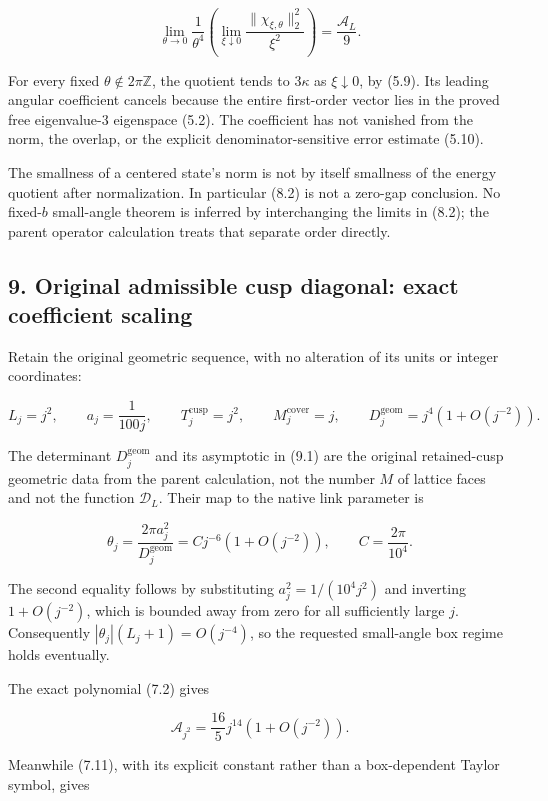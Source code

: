 \documentclass[
  11pt,
]{article}
\begin{document}
\[
\lim_{\theta\to0}\frac1{\theta^4}
\left(\lim_{\xi\downarrow0}\frac{\|\chi_{\xi,\theta}\|_2^2}{\xi^2}\right)
=\frac{\mathcal A_L}{9}.
\tag{8.2}
\]

For every fixed \(\theta\notin2\pi\mathbb Z\), the quotient tends to
\(3\kappa\) as \(\xi\downarrow0\), by (5.9). Its leading angular
coefficient cancels because the entire first-order vector lies in the
proved free eigenvalue-3 eigenspace (5.2). The coefficient has not
vanished from the norm, the overlap, or the explicit
denominator-sensitive error estimate (5.10).

The smallness of a centered state's norm is not by itself smallness of
the energy quotient after normalization. In particular (8.2) is not a
zero-gap conclusion. No fixed-\(b\) small-angle theorem is inferred by
interchanging the limits in (8.2); the parent operator calculation
treats that separate order directly.

\subsection{9. Original admissible cusp diagonal: exact coefficient
scaling}\label{magnetic-part-2-original-admissible-cusp-diagonal-exact-coefficient-scaling}

Retain the original geometric sequence, with no alteration of its units
or integer coordinates:

\[
L_j=j^2,\qquad a_j=\frac1{100j},\qquad
T_j^{\mathrm{cusp}}=j^2,\qquad M_j^{\mathrm{cover}}=j,
\qquad D_j^{\mathrm{geom}}=j^4(1+O(j^{-2})).
\tag{9.1}
\]

The determinant \(D_j^{\mathrm{geom}}\) and its asymptotic in (9.1) are
the original retained-cusp geometric data from the parent calculation,
not the number \(M\) of lattice faces and not the function
\(\mathcal D_L\). Their map to the native link parameter is

\[
\theta_j=\frac{2\pi a_j^2}{D_j^{\mathrm{geom}}}
=Cj^{-6}(1+O(j^{-2})),\qquad C=\frac{2\pi}{10^4}.
\tag{9.2}
\]

The second equality follows by substituting \(a_j^2=1/(10^4j^2)\) and
inverting \(1+O(j^{-2})\), which is bounded away from zero for all
sufficiently large \(j\). Consequently \(|\theta_j|(L_j+1)=O(j^{-4})\),
so the requested small-angle box regime holds eventually.

The exact polynomial (7.2) gives

\[
\mathcal A_{j^2}=\frac{16}{5}j^{14}(1+O(j^{-2})).
\tag{9.3}
\]

Meanwhile (7.11), with its explicit constant rather than a box-dependent
Taylor symbol, gives
\end{document}
